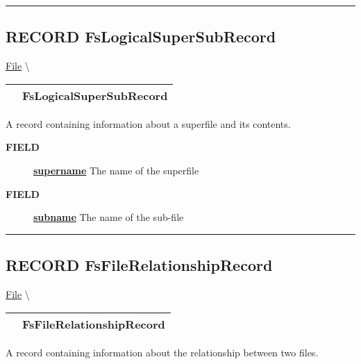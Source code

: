 \rule{\linewidth}{0.5pt}
\subsection*{\textsf{\colorbox{headtoc}{\color{white} RECORD}
FsLogicalSuperSubRecord}}

\hypertarget{ecldoc:file.fslogicalsupersubrecord}{}
\hspace{0pt} \hyperlink{ecldoc:File}{File} \textbackslash 

{\renewcommand{\arraystretch}{1.5}
\begin{tabularx}{\textwidth}{|>{\raggedright\arraybackslash}l|X|}
\hline
\hspace{0pt}\mytexttt{\color{red} } & \textbf{FsLogicalSuperSubRecord} \\
\hline
\end{tabularx}
}

\par
A record containing information about a superfile and its contents.

\par
\begin{description}
\item [\colorbox{tagtype}{\color{white} \textbf{\textsf{FIELD}}}] \textbf{\underline{supername}} The name of the superfile
\item [\colorbox{tagtype}{\color{white} \textbf{\textsf{FIELD}}}] \textbf{\underline{subname}} The name of the sub-file
\end{description}

\rule{\linewidth}{0.5pt}
\subsection*{\textsf{\colorbox{headtoc}{\color{white} RECORD}
FsFileRelationshipRecord}}

\hypertarget{ecldoc:file.fsfilerelationshiprecord}{}
\hspace{0pt} \hyperlink{ecldoc:File}{File} \textbackslash 

{\renewcommand{\arraystretch}{1.5}
\begin{tabularx}{\textwidth}{|>{\raggedright\arraybackslash}l|X|}
\hline
\hspace{0pt}\mytexttt{\color{red} } & \textbf{FsFileRelationshipRecord} \\
\hline
\end{tabularx}
}

\par
A record containing information about the relationship between two files.

